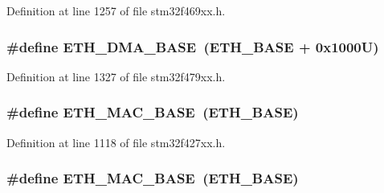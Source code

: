 Definition at line 1257 of file stm32f469xx.\+h.

\subsubsection[{\texorpdfstring{E\+T\+H\+\_\+\+D\+M\+A\+\_\+\+B\+A\+SE}{ETH_DMA_BASE}}]{\setlength{\rightskip}{0pt plus 5cm}\#define E\+T\+H\+\_\+\+D\+M\+A\+\_\+\+B\+A\+SE~({\bf E\+T\+H\+\_\+\+B\+A\+SE} + 0x1000\+U)}\hypertarget{group___peripheral__memory__map_gace2114e1b37c1ba88d60f3e831b67e93}{}\label{group___peripheral__memory__map_gace2114e1b37c1ba88d60f3e831b67e93}


Definition at line 1327 of file stm32f479xx.\+h.

\subsubsection[{\texorpdfstring{E\+T\+H\+\_\+\+M\+A\+C\+\_\+\+B\+A\+SE}{ETH_MAC_BASE}}]{\setlength{\rightskip}{0pt plus 5cm}\#define E\+T\+H\+\_\+\+M\+A\+C\+\_\+\+B\+A\+SE~({\bf E\+T\+H\+\_\+\+B\+A\+SE})}\hypertarget{group___peripheral__memory__map_ga3cf7005808feb61bff1fee01e50a711a}{}\label{group___peripheral__memory__map_ga3cf7005808feb61bff1fee01e50a711a}


Definition at line 1118 of file stm32f427xx.\+h.

\subsubsection[{\texorpdfstring{E\+T\+H\+\_\+\+M\+A\+C\+\_\+\+B\+A\+SE}{ETH_MAC_BASE}}]{\setlength{\rightskip}{0pt plus 5cm}\#define E\+T\+H\+\_\+\+M\+A\+C\+\_\+\+B\+A\+SE~({\bf E\+T\+H\+\_\+\+B\+A\+SE})}\hypertarget{group___peripheral__memory__map_ga3cf7005808feb61bff1fee01e50a711a}{}\label{group___peripheral__memory__map_ga3cf7005808feb61bff1fee01e50a711a}


